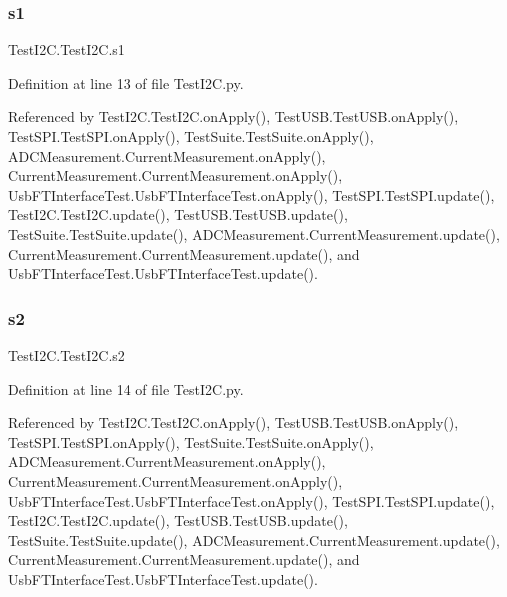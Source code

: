 \subsubsection{\texorpdfstring{s1}{s1}}
{\footnotesize\ttfamily Test\+I2\+C.\+Test\+I2\+C.\+s1}



Definition at line 13 of file Test\+I2\+C.\+py.



Referenced by Test\+I2\+C.\+Test\+I2\+C.\+on\+Apply(), Test\+U\+S\+B.\+Test\+U\+S\+B.\+on\+Apply(), Test\+S\+P\+I.\+Test\+S\+P\+I.\+on\+Apply(), Test\+Suite.\+Test\+Suite.\+on\+Apply(), A\+D\+C\+Measurement.\+Current\+Measurement.\+on\+Apply(), Current\+Measurement.\+Current\+Measurement.\+on\+Apply(), Usb\+F\+T\+Interface\+Test.\+Usb\+F\+T\+Interface\+Test.\+on\+Apply(), Test\+S\+P\+I.\+Test\+S\+P\+I.\+update(), Test\+I2\+C.\+Test\+I2\+C.\+update(), Test\+U\+S\+B.\+Test\+U\+S\+B.\+update(), Test\+Suite.\+Test\+Suite.\+update(), A\+D\+C\+Measurement.\+Current\+Measurement.\+update(), Current\+Measurement.\+Current\+Measurement.\+update(), and Usb\+F\+T\+Interface\+Test.\+Usb\+F\+T\+Interface\+Test.\+update().

\mbox{\label{classTestI2C_1_1TestI2C_a17d8f06f958baf5845484d3bd12b3d1b}} 
\subsubsection{\texorpdfstring{s2}{s2}}
{\footnotesize\ttfamily Test\+I2\+C.\+Test\+I2\+C.\+s2}



Definition at line 14 of file Test\+I2\+C.\+py.



Referenced by Test\+I2\+C.\+Test\+I2\+C.\+on\+Apply(), Test\+U\+S\+B.\+Test\+U\+S\+B.\+on\+Apply(), Test\+S\+P\+I.\+Test\+S\+P\+I.\+on\+Apply(), Test\+Suite.\+Test\+Suite.\+on\+Apply(), A\+D\+C\+Measurement.\+Current\+Measurement.\+on\+Apply(), Current\+Measurement.\+Current\+Measurement.\+on\+Apply(), Usb\+F\+T\+Interface\+Test.\+Usb\+F\+T\+Interface\+Test.\+on\+Apply(), Test\+S\+P\+I.\+Test\+S\+P\+I.\+update(), Test\+I2\+C.\+Test\+I2\+C.\+update(), Test\+U\+S\+B.\+Test\+U\+S\+B.\+update(), Test\+Suite.\+Test\+Suite.\+update(), A\+D\+C\+Measurement.\+Current\+Measurement.\+update(), Current\+Measurement.\+Current\+Measurement.\+update(), and Usb\+F\+T\+Interface\+Test.\+Usb\+F\+T\+Interface\+Test.\+update().

